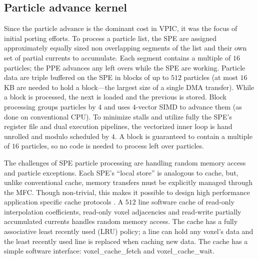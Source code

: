 \documentclass[letter,10pt]{article}
\begin{document}

\subsection{Particle advance kernel}

Since the particle advance is the dominant cost in VPIC, it was the
focus of initial porting efforts.  To process a particle list, the
SPE are assigned approximately equally sized non overlapping segments
of the list and their own set of partial currents to accumulate.  Each
segment contains a multiple of $16$ particles; the PPE advances any
left overs while the SPE are working.  Particle data are triple
buffered on the SPE in blocks of up to $512$ particles (at most $16$
KB are needed to hold a block---the largest size of a single DMA
transfer).  While a block is processed, the next is loaded and the
previous is stored.
Block processing groups particles by $4$ and uses $4$-vector SIMD to
advance them (as done on conventional CPU).  To minimize
stalls and utilize fully the SPE's register file and dual execution
pipelines, the vectorized inner loop is hand unrolled and modulo
scheduled by $4$.  A block is guaranteed to contain a multiple
of $16$ particles, so no code is needed to process left over particles.

The challenges of SPE particle processing are handling random memory
access and particle exceptions.  Each SPE's ``local store'' is
analogous to cache, but, unlike conventional cache, memory transfers
must be explicitly managed through the MFC.  Though
non-trivial, this makes it possible to design high performance
application specific cache protocols \cite{Kahle_et_al_2005}.  A $512$
line software cache of read-only interpolation coefficients, read-only
voxel adjacencies and read-write partially accumulated currents
handles random memory access.  The cache has a fully associative least
recently used (LRU) policy; a line can hold any voxel's data and the
least recently used line is replaced when caching new data.  The cache
has a simple software interface: voxel\_cache\_fetch and
voxel\_cache\_wait.
\end{document}
